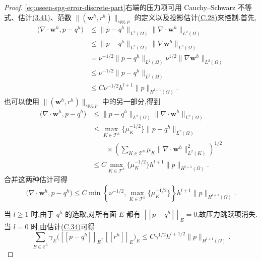 \begin{proof}
\cref{eq:oseen-spg-error-discrete-part}右端的压力项可用 Cauchy--Schwarz 不等式、估计\hyperref[eq:divergence-gradient-bound-h1]{(3.41)}、范数 $\|(\bm{w}^h,r^h)\|_{\mathrm{spg},p}$ 的定义以及投影估计\hyperref[eq:appendix-c-28]{(C.28)}来控制.首先,
\begin{equation*}
\begin{aligned}
 \bigl(\nabla\cdot\bm{w}^h,p-q^h\bigr)
 &\le\|p-q^h\|_{L^2(\Omega)}
       \|\nabla\cdot\bm{w}^h\|_{L^2(\Omega)}\\
 &\le\|p-q^h\|_{L^2(\Omega)}
       \|\nabla\bm{w}^h\|_{L^2(\Omega)}\\
 &=\nu^{-1/2}\|p-q^h\|_{L^2(\Omega)}
       \nu^{1/2}\|\nabla\bm{w}^h\|_{L^2(\Omega)}\\
 &\le\nu^{-1/2}\|p-q^h\|_{L^2(\Omega)}\\
 &\le C\nu^{-1/2}h^{l+1}\|p\|_{H^{l+1}(\Omega)}.
\end{aligned}
\end{equation*}
也可以使用 $\|(\bm{w}^h,r^h)\|_{\mathrm{spg},p}$ 中的另一部分,得到
\begin{equation*}
\begin{aligned}
 \bigl(\nabla\cdot\bm{w}^h,p-q^h\bigr)
 &\le\|p-q^h\|_{L^2(\Omega)}
       \|\nabla\cdot\bm{w}^h\|_{L^2(\Omega)}\\
 &\le\max_{K\in\mathcal{T}^h}\{\mu_K^{-1/2}\}
       \|p-q^h\|_{L^2(\Omega)}\\
 &\qquad\times\left(\sum_{K\in\mathcal{T}^h}\mu_K
       \|\nabla\cdot\bm{w}^h\|_{L^2(K)}^2\right)^{1/2}\\
 &\le C\max_{K\in\mathcal{T}^h}\{\mu_K^{-1/2}\}
       h^{l+1}\|p\|_{H^{l+1}(\Omega)}.
\end{aligned}
\end{equation*}
合并这两种估计可得
\begin{equation}\label{eq:oseen-spg-error-pressure-divergence}
 \bigl(\nabla\cdot\bm{w}^h,p-q^h\bigr)
 \le C\min\left\{\nu^{-1/2},
       \max_{K\in\mathcal{T}^h}\{\mu_K^{-1/2}\}\right\}
       h^{l+1}\|p\|_{H^{l+1}(\Omega)}.
\end{equation}

当 $l\ge1$ 时,由于 $q^h$ 的选取,对所有面 $E$ 都有 $[\![p-q^h]\!]_E=0$,故压力跳跃项消失.当 $l=0$ 时,由估计\hyperref[eq:appendix-c-34]{(C.34)}可得
\begin{equation}\label{eq:oseen-spg-error-pressure-jumps}
 \sum_{E\in\mathcal{E}^h}\gamma_E
       \bigl([\![p-q^h]\!]_E,[\![r^h]\!]_E\bigr)_E
 \le C\gamma^{1/2}h^{l+1/2}
       \|p\|_{H^{l+1}(\Omega)}.
\end{equation}


\end{proof}

